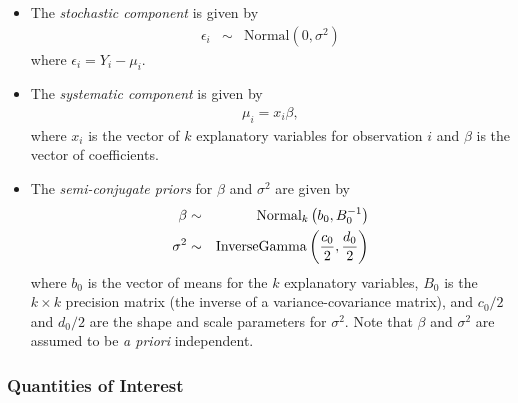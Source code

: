 \begin{itemize}
\item The \emph{stochastic component} is given by
\begin{eqnarray*}
\epsilon_{i}  &  \sim & \textrm{Normal}(0, \sigma^2)
\end{eqnarray*}
where $\epsilon_{i}=Y_i-\mu_i$.

\item The \emph{systematic component} is given by
\begin{eqnarray*}
\mu_{i}= x_{i} \beta,
\end{eqnarray*}
where $x_{i}$ is the vector of $k$ explanatory variables for observation $i$
and $\beta$ is the vector of coefficients.

\item The \emph{semi-conjugate priors} for $\beta$ and $\sigma^2$ are given by
\begin{eqnarray*}
\beta & \sim & \textrm{Normal}_k \left( b_{0},B_{0}^{-1}\right) \\
\sigma^{2} & \sim & {\rm InverseGamma}\left( \frac{c_0}{2}, 
\frac{d_0}{2} \right) 
\end{eqnarray*}
where $b_{0}$ is the vector of means for the $k$ explanatory
variables, $B_{0}$ is the $k\times k$ precision matrix (the inverse of
a variance-covariance matrix), and $c_0/2$ and $d_0/2$ are the shape and
scale parameters for $\sigma^{2}$.  Note that $\beta$ and $\sigma^2$
are assumed to be \emph{a priori} independent.
\end{itemize}

\subsubsection{Quantities of Interest}

